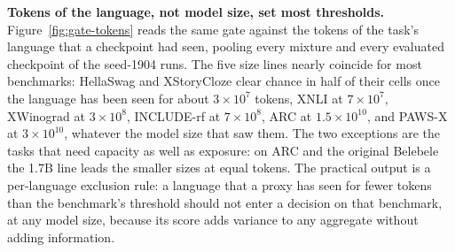 \textbf{Tokens of the language, not model size, set most thresholds.}
Figure~\ref{fig:gate-tokens} reads the same gate against the tokens of the task's language that a checkpoint had seen, pooling every mixture and every evaluated checkpoint of the seed-1904 runs.
The five size lines nearly coincide for most benchmarks: HellaSwag and XStoryCloze clear chance in half of their cells once the language has been seen for about $3\times10^{7}$ tokens, XNLI at $7\times10^{7}$, XWinograd at $3\times10^{8}$, INCLUDE-rf at $7\times10^{8}$, ARC at $1.5\times10^{10}$, and PAWS-X at $3\times10^{10}$, whatever the model size that saw them.
The two exceptions are the tasks that need capacity as well as exposure: on ARC and the original Belebele the 1.7B line leads the smaller sizes at equal tokens.
The practical output is a per-language exclusion rule: a language that a proxy has seen for fewer tokens than the benchmark's threshold should not enter a decision on that benchmark, at any model size, because its score adds variance to any aggregate without adding information.
